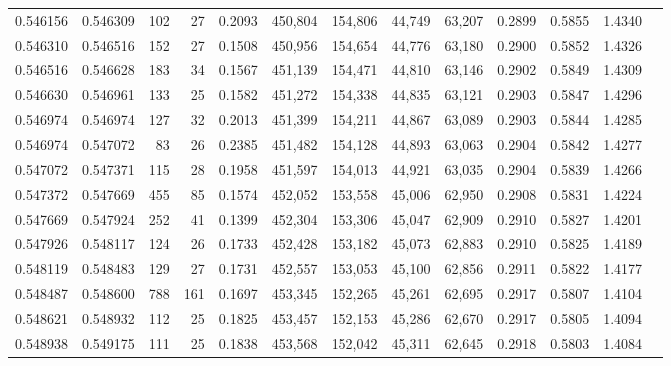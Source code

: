 \begin{tabular}{rrrrrrrrrrrrr}
0.546156 & 0.546309 &   102 &  27 &                                     0.2093 & 450,804 & 154,806 &  44,749 &  63,207 & 0.2899 & 0.5855 & 1.4340 \\
0.546310 & 0.546516 &   152 &  27 &                                     0.1508 & 450,956 & 154,654 &  44,776 &  63,180 & 0.2900 & 0.5852 & 1.4326 \\
0.546516 & 0.546628 &   183 &  34 &                                     0.1567 & 451,139 & 154,471 &  44,810 &  63,146 & 0.2902 & 0.5849 & 1.4309 \\
0.546630 & 0.546961 &   133 &  25 &                                     0.1582 & 451,272 & 154,338 &  44,835 &  63,121 & 0.2903 & 0.5847 & 1.4296 \\
0.546974 & 0.546974 &   127 &  32 &                                     0.2013 & 451,399 & 154,211 &  44,867 &  63,089 & 0.2903 & 0.5844 & 1.4285 \\
0.546974 & 0.547072 &    83 &  26 &                                     0.2385 & 451,482 & 154,128 &  44,893 &  63,063 & 0.2904 & 0.5842 & 1.4277 \\
0.547072 & 0.547371 &   115 &  28 &                                     0.1958 & 451,597 & 154,013 &  44,921 &  63,035 & 0.2904 & 0.5839 & 1.4266 \\
0.547372 & 0.547669 &   455 &  85 &                                     0.1574 & 452,052 & 153,558 &  45,006 &  62,950 & 0.2908 & 0.5831 & 1.4224 \\
0.547669 & 0.547924 &   252 &  41 &                                     0.1399 & 452,304 & 153,306 &  45,047 &  62,909 & 0.2910 & 0.5827 & 1.4201 \\
0.547926 & 0.548117 &   124 &  26 &                                     0.1733 & 452,428 & 153,182 &  45,073 &  62,883 & 0.2910 & 0.5825 & 1.4189 \\
0.548119 & 0.548483 &   129 &  27 &                                     0.1731 & 452,557 & 153,053 &  45,100 &  62,856 & 0.2911 & 0.5822 & 1.4177 \\
0.548487 & 0.548600 &   788 & 161 &                                     0.1697 & 453,345 & 152,265 &  45,261 &  62,695 & 0.2917 & 0.5807 & 1.4104 \\
0.548621 & 0.548932 &   112 &  25 &                                     0.1825 & 453,457 & 152,153 &  45,286 &  62,670 & 0.2917 & 0.5805 & 1.4094 \\
0.548938 & 0.549175 &   111 &  25 &                                     0.1838 & 453,568 & 152,042 &  45,311 &  62,645 & 0.2918 & 0.5803 & 1.4084 \\

\end{tabular}
